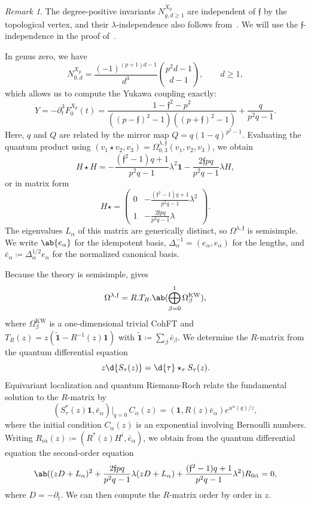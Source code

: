 \documentclass{amsart}
\theoremstyle{definition}
\theoremstyle{remark}
\newtheorem{rmk}[thm]{Remark}
\theoremstyle{plain}
\theoremstyle{definition}
\theoremstyle{remark}
\newcommand{\mf}[1]{\mathfrak{#1}}
\newcommand{\mr}[1]{\mathrm{#1}}
\newcommand{\wt}[1]{\widetilde{#1}}
\newcommand{\1}{\mathbf{1}}
\newcommand{\2}{\mathbf{2}}
\newcommand{\3}{\mathbf{3}}
\begin{document}
\begin{rmk}
    The degree-positive invariants \(N^{X_p}_{g,d\geq1}\) are independent of \(\mf{f}\) by the topological vertex, and their \(\lambda\)-independence also follows from~. We will use the \(\mf{f}\)-independence in the proof of~.
\end{rmk}

In genus zero, we have
\[ N^{X_p}_{0,d} = \frac{(-1)^{(p+1)d-1}}{d^3}\binom{p^2d-1}{d-1}, \qquad d \geq 1, \]
which allows us to compute the Yukawa coupling exactly:
\[ Y = -\partial_t^3 F_0^{X_p}(t) = \frac{1-\mf{f}^2-p^2}{((p-\mf{f})^2-1)((p+\mf{f})^2-1)} + \frac{q}{p^2q-1}. \]
Here, \(q\) and \(Q\) are related by the mirror map \(Q = q(1-q)^{p^2-1}\). Evaluating the quantum product using \((v_1 \star v_2, v_3) = \Omega^{\lambda,\mf{f}}_{0,3}(v_1,v_2,v_3)\), we obtain
\[ H \star H = -\frac{(\mf{f}^2-1)q+1}{p^2q-1}\lambda^2 \1 - \frac{2\mf{f}pq}{p^2q-1}\lambda H, \]
or in matrix form
\[ H \star = \begin{pmatrix} 0 & -\frac{(\mf{f}^2-1)q+1}{p^2q-1}\lambda^2 \\ 1 & -\frac{2\mf{f}pq}{p^2q-1}\lambda \end{pmatrix}. \]
The eigenvalues \(L_{\alpha}\) of this matrix are generically distinct, so \(\Omega^{\lambda,\mf{f}}\) is semisimple. We write \(\ab\{e_{\alpha}\}\) for the idempotent basis, \(\Delta_{\alpha}^{-1} = (e_{\alpha},e_{\alpha})\) for the lengths, and \(\bar{e}_{\alpha} \coloneqq \Delta_{\alpha}^{1/2}e_{\alpha}\) for the normalized canonical basis.

Because the theory is semisimple,  gives
\[ \Omega^{\lambda,\mf{f}} = R.T_R.\ab(\bigoplus_{\beta=0}^1 \Omega^{\mr{KW}}_{\beta}), \]
where \(\Omega^{\mr{KW}}_{\beta}\) is a one-dimensional trivial CohFT and \(T_R(z) = z(\wt{\1}-R^{-1}(z)\1)\) with \(\wt{\1} \coloneqq \sum_{\beta}\bar{e}_{\beta}\). We determine the \(R\)-matrix from the quantum differential equation
\[ z \d{S_{\tau}(z)} = \d{\tau} \star_{\tau} S_{\tau}(z). \]
Equivariant localization and quantum Riemann-Roch relate the fundamental solution to the \(R\)-matrix by
\[ (S^*_{\tau}(z)\1, \bar{e}_{\alpha})\big|_{q=0}\, C_{\alpha}(z) = (\1, R(z)\bar{e}_{\alpha})e^{u^{\alpha}(q)/z}, \]
where the initial condition \(C_{\alpha}(z)\) is an exponential involving Bernoulli numbers. Writing \(R_{i\bar{\alpha}}(z) \coloneqq (R^*(z)H^i, \bar{e}_{\alpha})\), we obtain from the quantum differential equation the second-order equation
\[ \ab( (zD+L_{\alpha})^2 + \frac{2\mf{f}pq}{p^2q-1}\lambda(zD+L_{\alpha}) + \frac{(\mf{f}^2-1)q+1}{p^2q-1}\lambda^2 )R_{0\bar{\alpha}} = 0, \]
where \(D = -\partial_t\). We can then compute the \(R\)-matrix order by order in \(z\).
\end{document}

